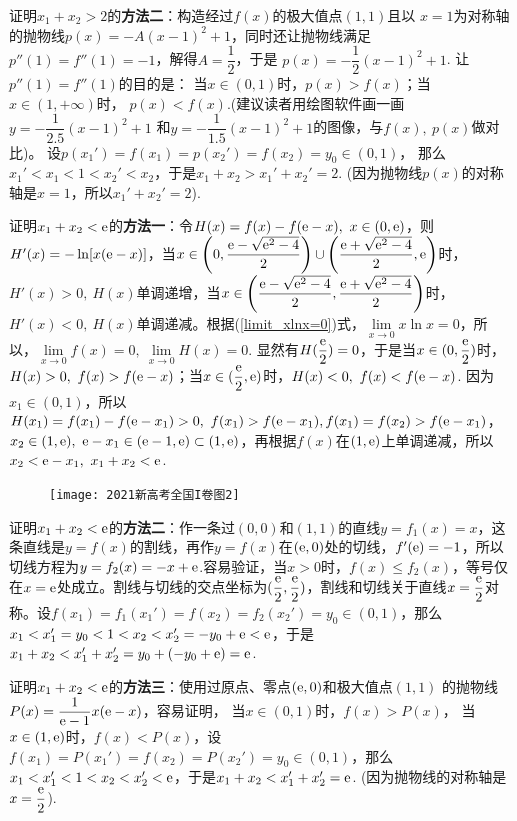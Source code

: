 \begin{enumerate}[label={【\textbf{例\thechapter.\arabic*}】},
 leftmargin=\inteval{\myenumleftmargin}pt,
 itemsep=\inteval{\myenumitempsep}pt,
 itemindent=\inteval{\myenumitemindent}pt]
证明$ x_1+x_2>2 $的\textbf{方法二}：构造经过$ f(x) $的极大值点$ (1,1) $且以
$ x=1 $为对称轴的抛物线$ p(x)=-A(x-1)^2+1 $，同时还让抛物线满足
$ p''(1)=f''(1)=-1 $，解得$ A=\dfrac{1}{2} $，于是
$ p(x)=-\dfrac{1}{2}(x-1)^2+1 $. 让$ p''(1)=f''(1) $的目的是：
当$ x\in(0,1) $时，$ p(x)>f(x) $；当$ x\in(1,+\infty) $时，
$ p(x)<f(x) $.(建议读者用绘图软件画一画$ y=-\dfrac{1}{2.5}(x-1)^2+1 $
和$ y=-\dfrac{1}{1.5}(x-1)^2+1 $的图像，与$ f(x),\ p(x) $做对比)。
设$ p(x_1')=f(x_1)=p(x_2')=f(x_2)=y_0\in(0,1) $，
那么$ x_1'<x_1<1<x_2'<x_2 $，于是$ x_1+x_2>x_1'+x_2'=2 $.
(因为抛物线$ p(x) $的对称轴是$ x=1 $，所以$ x_1'+x_2'=2 $). 

证明$ x_1+x_2<\mathrm{e} $的\textbf{方法一}：令$ H(x)=f(x)-f(\mathrm{e}-x),\ x\in (0,\mathrm{e}) $，则$ H'(x)=-\ln[x(\mathrm{e}-x)] $，当$ x\in \left(0,\dfrac{\mathrm{e}-\sqrt{\mathrm{e}^2-4}}{2}\right)\cup\left(\dfrac{\mathrm{e}+\sqrt{\mathrm{e}^2-4}}{2},\mathrm{e}\right) $时，$ H'(x)>0,\ H(x) $单调递增，当$ x\in \left(\dfrac{\mathrm{e}-\sqrt{\mathrm{e}^2-4}}{2},\dfrac{\mathrm{e}+\sqrt{\mathrm{e}^2-4}}{2}\right) $时，$ H'(x)<0,\ H(x) $单调递减。根据(\ref{limit_xlnx=0})式，$ \lim\limits_{x\to 0} x\ln x=0 $，所以，$ \lim\limits_{x\to 0} f(x)=0,\ \lim\limits_{x\to 0} H(x)=0 $. 显然有$ H(\dfrac{\mathrm{e}}{2})=0 $，于是当$ x\in (0,\dfrac{\mathrm{e}}{2}) $时，$ H(x)>0,\ f(x)>f(\mathrm{e}-x) $；当$ x\in (\dfrac{\mathrm{e}}{2},\mathrm{e}) $时，$ H(x)<0,\ f(x)<f(\mathrm{e}-x) $. 因为$ x_1\in(0,1) $，所以$ H(x_1)=f(x_1)-f(\e-x_1)>0,\ f(x_1)>f(\e-x_1),f(x_1)=f(x_2)>f(\e-x_1) $，
$ x_2\in(1,\mathrm{e}),\ \mathrm{e}-x_1\in (\mathrm{e}-1,\mathrm{e})\subset(1,\mathrm{e}) $，再根据$ f(x) $在$ (1,\mathrm{e}) $上单调递减，所以$ x_2<\mathrm{e}-x_1,\ x_1+x_2<\mathrm{e} $.
\begin{figure}[h]
	\centering
	\texttt{[image: 2021新高考全国I卷图2]}
\end{figure}

证明$ x_1+x_2<\mathrm{e} $的\textbf{方法二}：作一条过$ (0,0) $和$ (1,1) $的直线$ y=f_1(x)=x $，这条直线是$ y=f(x) $的割线，再作$ y=f(x) $在$ (\mathrm{e},0) $处的切线，$ f'(\mathrm{e})=-1 $，所以切线方程为$ y=f_2(x)=-x+\mathrm{e} $.容易验证，当$ x>0 $时，$ f(x)\leq f_2(x) $，等号仅在$ x=\mathrm{e} $处成立。割线与切线的交点坐标为$ (\dfrac{\mathrm{e}}{2},\dfrac{\mathrm{e}}{2}) $，割线和切线关于直线$ x=\dfrac{\mathrm{e}}{2} $对称。设$ f(x_1)=f_1(x_1')=f(x_2)=f_2(x_2')=y_0\in(0,1) $，那么$ x_1<x_1'=y_0<1<x_2<x_2'=-y_0+\mathrm{e}<\mathrm{e} $，于是$ x_1+x_2<x_1'+x_2'=y_0+(-y_0+\mathrm{e})=\mathrm{e} $. 

证明$ x_1+x_2<\mathrm{e} $的\textbf{方法三}：使用过原点、零点$ (\mathrm{e},0) $和极大值点$ (1,1) $
的抛物线$ P(x)=\dfrac{1}{\mathrm{e}-1}x(\mathrm{e}-x) $，容易证明，
当$ x\in(0,1) $时，$ f(x)>P(x) $，
当$ x\in(1,\mathrm{e}) $时，$ f(x)<P(x) $，设$ f(x_1)=P(x_1')=f(x_2)=P(x_2')=y_0\in(0,1) $，那么$ x_1<x_1'<1<x_2<x_2'<\mathrm{e} $，于是$ x_1+x_2<x_1'+x_2'=\mathrm{e} $.
(因为抛物线的对称轴是$ x=\dfrac{\mathrm{e}}{2} $). 


\end{enumerate}
